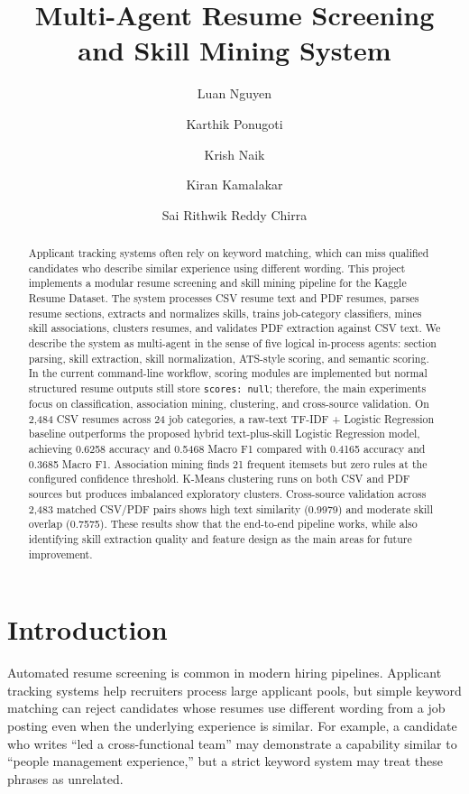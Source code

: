 \documentclass[sigconf, authorversion, nonacm]{acmart}
\title{Multi-Agent Resume Screening and Skill Mining System}
\author{Luan Nguyen}
\affiliation{\institution{Arizona State University}\city{Tempe}\state{AZ}\country{USA}}
\author{Karthik Ponugoti}
\affiliation{\institution{Arizona State University}\city{Tempe}\state{AZ}\country{USA}}
\author{Krish Naik}
\affiliation{\institution{Arizona State University}\city{Tempe}\state{AZ}\country{USA}}
\author{Kiran Kamalakar}
\affiliation{\institution{Arizona State University}\city{Tempe}\state{AZ}\country{USA}}
\author{Sai Rithwik Reddy Chirra}
\affiliation{\institution{Arizona State University}\city{Tempe}\state{AZ}\country{USA}}
\begin{document}
\begin{abstract}
Applicant tracking systems often rely on keyword matching, which can miss qualified candidates who describe similar experience using different wording. This project implements a modular resume screening and skill mining pipeline for the Kaggle Resume Dataset. The system processes CSV resume text and PDF resumes, parses resume sections, extracts and normalizes skills, trains job-category classifiers, mines skill associations, clusters resumes, and validates PDF extraction against CSV text. We describe the system as multi-agent in the sense of five logical in-process agents: section parsing, skill extraction, skill normalization, ATS-style scoring, and semantic scoring. In the current command-line workflow, scoring modules are implemented but normal structured resume outputs still store \texttt{scores: null}; therefore, the main experiments focus on classification, association mining, clustering, and cross-source validation. On 2,484 CSV resumes across 24 job categories, a raw-text TF-IDF + Logistic Regression baseline outperforms the proposed hybrid text-plus-skill Logistic Regression model, achieving 0.6258 accuracy and 0.5468 Macro F1 compared with 0.4165 accuracy and 0.3685 Macro F1. Association mining finds 21 frequent itemsets but zero rules at the configured confidence threshold. K-Means clustering runs on both CSV and PDF sources but produces imbalanced exploratory clusters. Cross-source validation across 2,483 matched CSV/PDF pairs shows high text similarity (0.9979) and moderate skill overlap (0.7575). These results show that the end-to-end pipeline works, while also identifying skill extraction quality and feature design as the main areas for future improvement.
\end{abstract}

\maketitle

\section{Introduction}

Automated resume screening is common in modern hiring pipelines. Applicant tracking systems help recruiters process large applicant pools, but simple keyword matching can reject candidates whose resumes use different wording from a job posting even when the underlying experience is similar. For example, a candidate who writes ``led a cross-functional team'' may demonstrate a capability similar to ``people management experience,'' but a strict keyword system may treat these phrases as unrelated.
\end{document}
